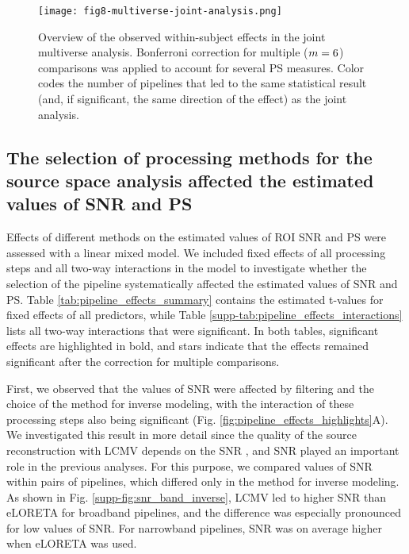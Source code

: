 \begin{figure}[htbp]
    \centering
    \texttt{[image: fig8-multiverse-joint-analysis.png]}
    \caption{Overview of the observed within-subject effects in the joint multiverse analysis. Bonferroni correction for multiple ($m=6$) comparisons was applied to account for several PS measures. Color codes the number of pipelines that led to the same statistical result (and, if significant, the same direction of the effect) as the joint analysis.}
    \label{fig:multiverse_joint_analysis}
\end{figure}

\subsection{The selection of processing methods for the source space analysis affected the estimated values of SNR and PS}

Effects of different methods on the estimated values of ROI SNR and PS were assessed with a linear mixed model. We included fixed effects of all processing steps and all two-way interactions in the model to investigate whether the selection of the pipeline systematically affected the estimated values of SNR and PS. Table \ref{tab:pipeline_effects_summary} contains the estimated t-values for fixed effects of all predictors, while Table \ref{supp-tab:pipeline_effects_interactions} lists all two-way interactions that were significant. In both tables, significant effects are highlighted in bold, and stars indicate that the effects remained significant after the correction for multiple comparisons.

\medskip

First, we observed that the values of SNR were affected by filtering and the choice of the method for inverse modeling, with the interaction of these processing steps also being significant (Fig. \ref{fig:pipeline_effects_highlights}A). We investigated this result in more detail since the quality of the source reconstruction with LCMV depends on the SNR \citep{LCMV_VanVeen1997}, and SNR played an important role in the previous analyses. For this purpose, we compared values of SNR within pairs of pipelines, which differed only in the method for inverse modeling. As shown in Fig. \ref{supp-fig:snr_band_inverse}, LCMV led to higher SNR than eLORETA for broadband pipelines, and the difference was especially pronounced for low values of SNR. For narrowband pipelines, SNR was on average higher when eLORETA was used.

